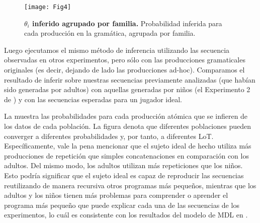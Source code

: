 \begin{figure}[!ht]
    \centering
    \texttt{[image: Fig4]}
    \caption{{\bf $\theta_i$ inferido agrupado por familia.} Probabilidad inferida para cada producción en la gramática, agrupada por familia.}
    \label{fig:thetaGrouped}
\end{figure}


Luego ejecutamos el mismo método de inferencia utilizando las secuencia observadas en otros experimentos, pero sólo con las producciones gramaticales originales (es decir, dejando de lado las producciones ad-hoc). Comparamos el resultado de inferir sobre nuestras secuencias previamente analizadas (que habían sido generadas por adultos) con aquellas generadas por niños (el Experimento 2 de   \cite{amalric2017language}) y con las secuencias esperadas para un jugador ideal.


La  muestra las probabilidades para cada producción atómica que se infieren de los datos de cada población. La figura denota que diferentes poblaciones pueden converger a diferentes probabilidades y, por tanto, a diferentes LoT. Específicamente, vale la pena mencionar que el sujeto ideal de hecho utiliza más producciones de repetición que simples concatenaciones en comparación con los adultos. Del mismo modo, los adultos utilizan más repeticiones que los niños. Esto podría significar que el sujeto ideal es capaz de reproducir las secuencias reutilizando de manera recursiva otros programas más pequeños, mientras que los adultos y los niños tienen más problemas para comprender o aprender el programa más pequeño que puede explicar cada una de las secuencias de los experimentos, lo cuál es consistente con los resultados del modelo de MDL en \cite{amalric2017language}.

